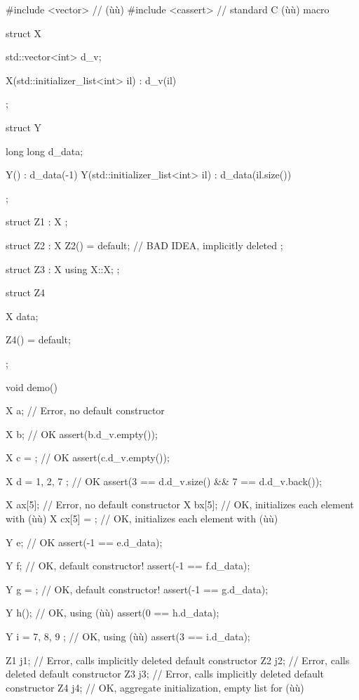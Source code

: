 \begin{emcppslisting}
#include <vector>   // (ù{}ù)
#include <cassert>  // standard C (ù{}ù) macro

struct X
{
    std::vector<int> d_v;

    X(std::initializer_list<int> il) : d_v(il) {}
};

struct Y
{
    long long d_data;

    Y() : d_data(-1) {}
    Y(std::initializer_list<int> il) : d_data(il.size()) {}
};

struct Z1 : X { };

struct Z2 : X
{
    Z2() = default;       // BAD IDEA, implicitly deleted
};

struct Z3 : X
{
    using X::X;
};

struct Z4
{
    X data;

    Z4() = default;
};

void demo()
{
    X a;                  // Error, no default constructor

    X b{};                // OK
    assert(b.d_v.empty());

    X c = {};             // OK
    assert(c.d_v.empty());

    X d = { 1, 2, 7 };    // OK
    assert(3 == d.d_v.size() && 7 == d.d_v.back());

    X ax[5];              // Error, no default constructor
    X bx[5]{};            // OK, initializes each element with (ù{\codeincomments{\{\}}}ù)
    X cx[5] = {};         // OK, initializes each element with (ù{\codeincomments{\{\}}}ù)

    Y e;                  // OK
    assert(-1 == e.d_data);

    Y f{};                // OK, default constructor!
    assert(-1 == f.d_data);

    Y g = {};             // OK, default constructor!
    assert(-1 == g.d_data);

    Y h({});              // OK, using (ù{}ù)
    assert(0  == h.d_data);

    Y i = { 7, 8, 9 };    // OK, using (ù{}ù)
    assert(3  == i.d_data);

    Z1 j1{};       // Error, calls implicitly deleted default constructor
    Z2 j2{};       // Error, calls deleted default constructor
    Z3 j3{};       // Error, calls implicitly deleted default constructor
    Z4 j4{};       // OK, aggregate initialization, empty list for (ù{}ù)

}
\end{emcppslisting}
